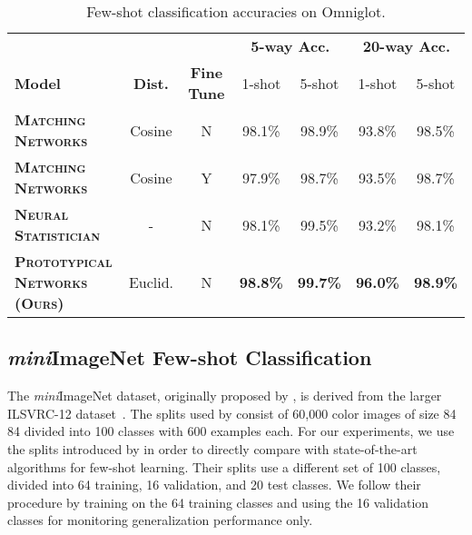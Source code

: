 \documentclass{article}
\def\abovestrut#1{\rule[0in]{0in}{#1}\ignorespaces}
\def\belowstrut#1{\rule[-#1]{0in}{#1}\ignorespaces}
\def\abovespace{\abovestrut{0.20in}}
\def\belowspace{\belowstrut{0.10in}}
\begin{document}
\begin{table*}[tb]
\caption{Few-shot classification accuracies on Omniglot.}
\vskip -0.1in
\label{tab:omniglot}
\begin{center}
\begin{small}
\begin{tabular}{lcccccc}
\hline
\abovespace
& & & \multicolumn{2}{c}{\textbf{5-way Acc.}} & \multicolumn{2}{c}{\textbf{20-way Acc.}} \\
\belowspace
\textbf{Model} & \textbf{Dist.} & \textbf{Fine Tune} & 1-shot & 5-shot & 1-shot & 5-shot \\
\hline
\abovespace
\textbf{\textsc{Matching Networks}} \citep{vinyals2016matching} & Cosine & N & 98.1\% & 98.9\% & 93.8\% & 98.5\% \\
\textbf{\textsc{Matching Networks}} \citep{vinyals2016matching} & Cosine & Y & 97.9\% & 98.7\% & 93.5\% & 98.7\% \\
\textbf{\textsc{Neural Statistician}} \citep{edwards2017towards} & - & N & 98.1\% & 99.5\% & 93.2\% & 98.1\% \\
\belowspace
\textbf{\textsc{Prototypical Networks (Ours)}} & Euclid. & N & \textbf{98.8\%} & \textbf{99.7\%} & \textbf{96.0\%} & \textbf{98.9\%} \\
\hline
\end{tabular}
\end{small}
\end{center}
\vskip -0.1in
\end{table*}

\subsection{\emph{mini}ImageNet Few-shot Classification}
\label{sec:miniimagenet}
The \emph{mini}ImageNet dataset, originally proposed by \citet{vinyals2016matching}, is derived from the larger ILSVRC-12 dataset~\citep{russakovsky2015imagenet}. The splits used by \citet{vinyals2016matching} consist of 60,000 color images of size 84  84 divided into 100 classes with 600 examples each. For our experiments, we use the splits introduced by \citet{ravi2017meta} in order to directly compare with state-of-the-art algorithms for few-shot learning. Their splits use a different set of 100 classes, divided into 64 training, 16 validation, and 20 test classes. We follow their procedure by training on the 64 training classes and using the 16 validation classes for monitoring generalization performance only.
\end{document}
